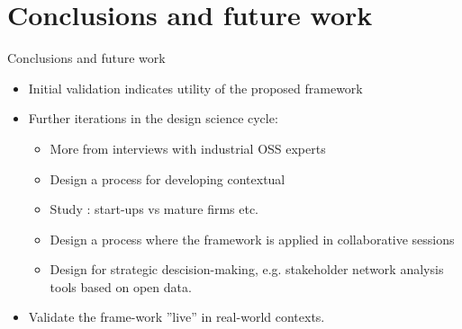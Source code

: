 \documentclass{slideclass}
\begin{document}
\section{Conclusions and future work}
\begin{Slide}{Conclusions and future work}
\begin{itemize}
\item Initial validation indicates utility of the proposed framework 
\item Further iterations in the design science cycle:
\begin{itemize}
\item More  from interviews with industrial OSS experts
\item Design a process for developing contextual 
\item Study : start-ups vs mature firms etc.
\item Design a  process where the framework is applied in collaborative sessions
\item Design  for strategic descision-making, e.g. stakeholder network analysis tools based on open data.
\end{itemize}
\item Validate the frame-work ''live'' in real-world contexts.
\end{itemize}

\end{Slide}

\end{document}

